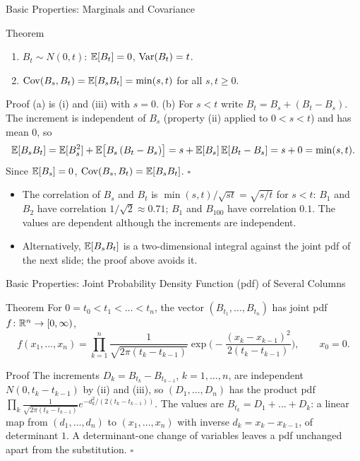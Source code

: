\begin{frame}{Basic Properties: Marginals and Covariance}
  \label{fr:bmcov}
  \small
  \begin{block}{Theorem}
    \begin{enumerate}
      \item[(a)] $B_t\sim N(0,t)$: $\mathbb{E}[B_t]=0$, $\operatorname{Var}(B_t)=t$.
      \item[(b)] $\operatorname{Cov}(B_s,B_t)=\mathbb{E}[B_sB_t]=\min(s,t)$ for all $s,t\ge0$.
    \end{enumerate}
  \end{block}
  \begin{block}{Proof}
    (a) is (i) and (iii) with $s=0$. (b) For $s<t$ write $B_t=B_s+(B_t-B_s)$. The increment is independent of $B_s$ (property (ii) applied to $0<s<t$) and has mean $0$, so
    \[
      \mathbb{E}[B_sB_t]=\mathbb{E}[B_s^2]+\mathbb{E}\big[B_s\,(B_t-B_s)\big]=s+\mathbb{E}[B_s]\,\mathbb{E}[B_t-B_s]=s+0=\min(s,t).
    \]
    Since $\mathbb{E}[B_s]=0$, $\operatorname{Cov}(B_s,B_t)=\mathbb{E}[B_sB_t]$. \hfill$\square$
  \end{block}
  \begin{itemize}
    \item The correlation of $B_s$ and $B_t$ is $\min(s,t)/\sqrt{st}=\sqrt{s/t}$ for $s<t$: $B_1$ and $B_2$ have correlation $1/\sqrt2\approx0.71$; $B_1$ and $B_{100}$ have correlation $0.1$. The values are dependent although the increments are independent.
    \item Alternatively, $\mathbb{E}[B_sB_t]$ is a two-dimensional integral against the joint pdf of the next slide; the proof above avoids it.
  \end{itemize}
\end{frame}

\begin{frame}{Basic Properties: Joint Probability Density Function (pdf) of Several Columns}
  \label{fr:bmjoint}
  \small
  \begin{block}{Theorem}
    For $0=t_0<t_1<\dots<t_n$, the vector $(B_{t_1},\dots,B_{t_n})$ has joint pdf $f\colon\mathbb{R}^n\to[0,\infty)$,
    \[
      f(x_1,\dots,x_n)=\prod_{k=1}^n\frac{1}{\sqrt{2\pi(t_k-t_{k-1})}}\exp\!\Big(-\frac{(x_k-x_{k-1})^2}{2(t_k-t_{k-1})}\Big),\qquad x_0=0 .
    \]
  \end{block}
  \begin{block}{Proof}
    The increments $D_k=B_{t_k}-B_{t_{k-1}}$, $k=1,\dots,n$, are independent $N(0,t_k-t_{k-1})$ by (ii) and (iii), so $(D_1,\dots,D_n)$ has the product pdf $\prod_k\frac{1}{\sqrt{2\pi(t_k-t_{k-1})}}e^{-d_k^2/(2(t_k-t_{k-1}))}$.
    The values are $B_{t_k}=D_1+\dots+D_k$: a linear map from $(d_1,\dots,d_n)$ to $(x_1,\dots,x_n)$ with inverse $d_k=x_k-x_{k-1}$, of determinant $1$. A determinant-one change of variables leaves a pdf unchanged apart from the substitution. \hfill$\square$
  \end{block}
\end{frame}

